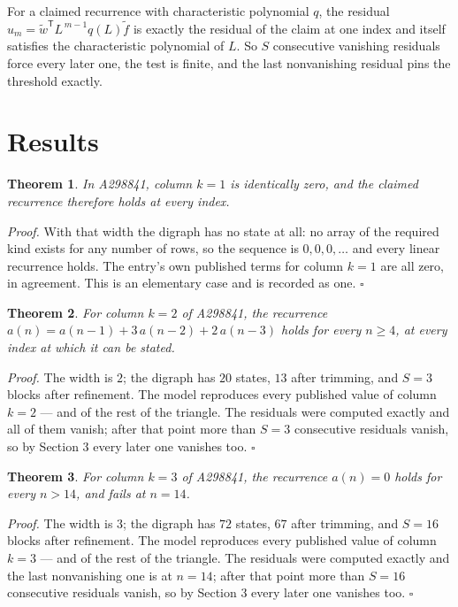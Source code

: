 \documentclass[11pt]{article}
\newtheorem{theorem}{Theorem}
\theoremstyle{definition}
\begin{document}
For a claimed recurrence with characteristic polynomial $q$, the residual $u_m = \tilde w^{\mathsf T}L^{\,m-1}q(L)\tilde f$ is exactly the residual of the claim at one index and itself satisfies the characteristic polynomial of $L$. So $S$ consecutive vanishing residuals force every later one, the test is finite, and the last nonvanishing residual pins the threshold exactly.

\section{Results}

\begin{theorem} In A298841, column $k = 1$ is identically zero, and the claimed recurrence therefore holds at every index.\end{theorem}

{\itshape Proof.} With that width the digraph has no state at all: no array of the required kind exists for any number of rows, so the sequence is $0,0,0,\dots$ and every linear recurrence holds. The entry's own published terms for column $k = 1$ are all zero, in agreement. This is an elementary case and is recorded as one. $\square$

\begin{theorem} For column $k = 2$ of A298841, the recurrence $a(n) = a(n-1) + 3\,a(n-2) + 2\,a(n-3)$ holds for every $n \ge 4$, at every index at which it can be stated.\end{theorem}

{\itshape Proof.} The width is $2$; the digraph has $20$ states, $13$ after trimming, and $S = 3$ blocks after refinement. The model reproduces every published value of column $k = 2$ --- and of the rest of the triangle. The residuals were computed exactly and all of them vanish; after that point more than $S = 3$ consecutive residuals vanish, so by Section 3 every later one vanishes too. $\square$

\begin{theorem} For column $k = 3$ of A298841, the recurrence $a(n) = 0$ holds for every $n > 14$, and fails at $n = 14$.\end{theorem}

{\itshape Proof.} The width is $3$; the digraph has $72$ states, $67$ after trimming, and $S = 16$ blocks after refinement. The model reproduces every published value of column $k = 3$ --- and of the rest of the triangle. The residuals were computed exactly and the last nonvanishing one is at $n = 14$; after that point more than $S = 16$ consecutive residuals vanish, so by Section 3 every later one vanishes too. $\square$
\end{document}
